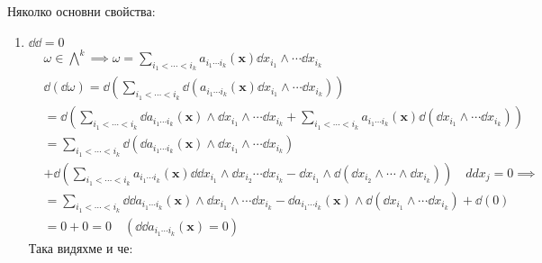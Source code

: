 \documentclass[12pt]{article}
\begin{document}
\begin{large}
Няколко основни свойства:
\begin{enumerate}
\begin{comment}
\item $\dd (\omega_1+\omega_2)=\dd \omega_1 + \dd \omega_2$
По индукция:
\begin{align*}
&\omega_1,\omega_2 \in {\bigwedge}^0: \quad  \omega_1=f, \enspace \omega_2=g,  
\dd (\omega_1+\omega_2)=\dd (f+g)=\dd f + \dd g = \dd \omega_1 + \dd \omega_2 \\
&\omega_1, \omega_2 \in {\bigwedge}^k: \quad d(\omega_1+\omega_2)=\dd(\sum_{i_1<\cdots<i_k}a_{i_1 \cdots i_k}(\mathbf{x}) \dd x_{i_1} \wedge \cdots \dd x_{i_k}+\sum_{i_1<\cdots<i_k}b_{i_1 \cdots i_k}(\mathbf{x}) \dd x_{i_1} \wedge \cdots \dd x_{i_k}) \\
&=\dd (\sum_{i_1<\cdots<i_k}(a_{i_1 \cdots i_k}(\mathbf{x})+b_{i_1 \cdots i_k}(\mathbf{x})) \dd x_{i_1} \wedge \cdots \dd x_{i_k}) \\
&=
\end{align*}
\end{comment}
\item $\dd \dd = 0$
\begin{align*}
&\omega \in {\bigwedge}^k \implies \omega = \sum_{i_1<\cdots<i_k}a_{i_1 \cdots i_k}(\mathbf{x}) \dd x_{i_1} \wedge \cdots \dd x_{i_k} \\
&\dd (\dd \omega) = \dd(\sum_{i_1<\cdots<i_k}\dd(a_{i_1 \cdots i_k}(\mathbf{x}) \dd x_{i_1} \wedge \cdots \dd x_{i_k})) \\
&= \dd (\sum_{i_1<\cdots<i_k} \dd a_{i_1 \cdots i_k}(\mathbf{x}) \wedge \dd x_{i_1} \wedge \cdots \dd x_{i_k} + \sum_{i_1<\cdots<i_k} a_{i_1 \cdots i_k}(\mathbf{x}) \dd(\dd x_{i_1} \wedge \cdots \dd x_{i_k})) \\
&=\sum_{i_1<\cdots<i_k}\dd(\dd a_{i_1 \cdots i_k}(\mathbf{x}) \wedge \dd x_{i_1} \wedge \cdots \dd x_{i_k}) \\ 
&+\dd (\sum_{i_1<\cdots<i_k} a_{i_1 \cdots i_k}(\mathbf{x}) \dd \dd x_{i_1} \wedge \dd x_{i_2} \cdots \dd x_{i_k}-\dd x_{i_1} \wedge \dd( \dd x_{i_2} \wedge \cdots \wedge \dd x_{i_k})) \quad ddx_j=0 \implies \\
&=\sum_{i_1<\cdots<i_k} \dd \dd a_{i_1 \cdots i_k}(\mathbf{x}) \wedge \dd x_{i_1} \wedge \cdots \dd x_{i_k} - \dd a_{i_1 \cdots i_k}(\mathbf{x}) \wedge \dd(\dd x_{i_1} \wedge \cdots \dd x_{i_k}) + \dd(0) \\
&=0 + 0 = 0 \quad (\dd \dd a_{i_1 \cdots i_k}(\mathbf{x})=0)
\end{align*}
Така видяхме и че:
\begin{align*}

\end{align*}
\end{enumerate}
\end{large}
\end{document}
